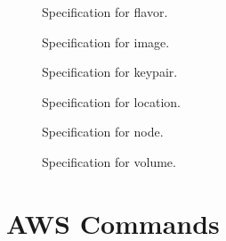 \documentclass[9pt,twocolumn,twoside]{../../styles/osajnl}
\begin{document}
\begin{figure}[htb]
\vspace{-1.0\baselineskip}
\caption{Specification for flavor.}\label{F:spec-flavor}
\end{figure}

\begin{figure}[htb]
\vspace{-1.0\baselineskip}
\caption{Specification for image.}\label{F:spec-image}
\end{figure}

\begin{figure}[htb]
\vspace{-1.0\baselineskip}
\caption{Specification for keypair.}\label{F:spec-keypair}
\end{figure}

\begin{figure}[htb]
\vspace{-1.0\baselineskip}
\caption{Specification for location.}\label{F:spec-location}
\end{figure}

\begin{figure}[htb]
\vspace{-1.0\baselineskip}
\caption{Specification for node.}\label{F:spec-node}
\end{figure}

\begin{figure}[htb]
\vspace{-1.0\baselineskip}
\caption{Specification for volume.}\label{F:spec-volume}
\end{figure}

\section{AWS Commands}
\end{document}
